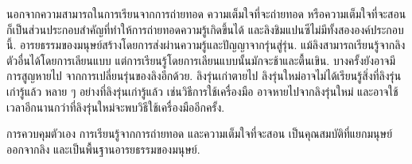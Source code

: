 {\begin{shaded}
		นอกจากความสามารถในการเรียนจากการถ่ายทอด
		ความเต็มใจที่จะถ่ายทอด หรือความเต็มใจที่จะสอน ก็เป็นส่วนประกอบสำคัญที่ทำให้การถ่ายทอดความรู้เกิดขึ้นได้
		และลิงชิมแปนซีไม่มีทั้งสององค์ประกอบนี้.
		อารยธรรมของมนุษย์สร้างโดยการส่งผ่านความรู้และปัญญาจากรุ่นสู่รุ่น.
		แม้ลิงสามารถเรียนรู้จากลิงตัวอื่นได้โดยการเลียนแบบ
		แต่การเรียนรู้โดยการเลียนแบบนั้นมักจะช้าและตื้นเขิน.
		บางครั้งยังอาจมีการสูญหายไป จากการเปลี่ยนรุ่นของลิงอีกด้วย.
		ลิงรุ่นเก่าตายไป ลิงรุ่นใหม่อาจไม่ได้เรียนรู้สิ่งที่ลิงรุ่นเก่ารู้แล้ว
		หลาย ๆ อย่างที่ลิงรุ่นเก่ารู้แล้ว เช่นวิธีการใช้เครื่องมือ อาจหายไปจากลิงรุ่นใหม่
		และอาจใช้เวลาอีกนานกว่าที่ลิงรุ่นใหม่จะพบวิธีใช้เครื่องมืออีกครั้ง.
		
		การควบคุมตัวเอง การเรียนรู้จากการถ่ายทอด และความเต็มใจที่จะสอน เป็นคุณสมบัติที่แยกมนุษย์ออกจากลิง 
		และเป็นพื้นฐานอารยธรรมของมนุษย์.
		\\
		
\begin{Parallel}[c]{0.42\textwidth}{0.38\textwidth}
\end{Parallel}
		
		
		
		
	\end{shaded}
}


